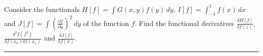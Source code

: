 \documentclass[12pt]{article}
\begin{document}
Consider the functionals
$H[f]=\int G(x,y)f(y)\,dy$,
$I[f]=\int_{-1}^1f(x)\,dx$
and
$J[f]=\int\left(\frac{\partial f}{\partial y}\right)^2\,dy$
of the function $f$.
Find the functional derivatives
$\frac{\delta H[f]}{\delta f(z)}$,
$\frac{\delta^2I(f^3)}{\delta f(x_0)\delta f(x_1)}$
and
$\frac{\delta J[f]}{\delta f(x)}$.

\bigskip
\hrule

\bigskip
\end{document}
